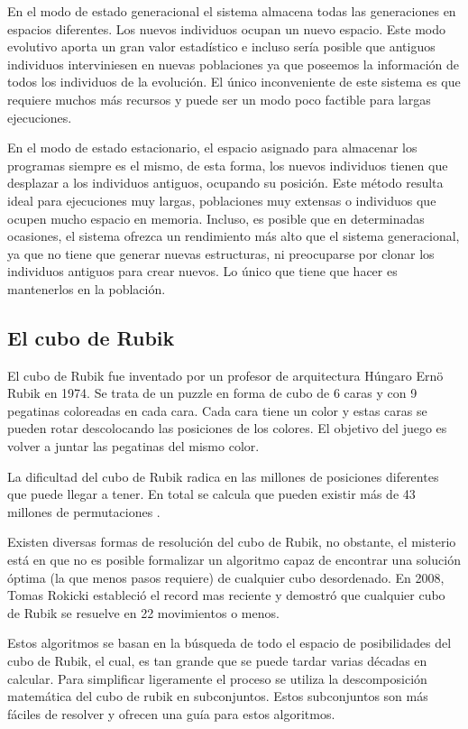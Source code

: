 En el modo de estado generacional el sistema almacena todas las generaciones en espacios diferentes. Los nuevos
individuos ocupan un nuevo espacio. Este modo evolutivo aporta un gran valor
estadístico e incluso sería posible que antiguos individuos interviniesen en
nuevas poblaciones ya que poseemos la información de todos los
individuos de la evolución. El único inconveniente de este sistema es que requiere muchos más recursos y puede
ser un modo poco factible para largas ejecuciones.

En el modo de estado estacionario, el espacio asignado para almacenar los
programas siempre es el mismo, de esta forma, los nuevos individuos tienen que
desplazar a los individuos antiguos, ocupando su posición. Este método resulta
ideal para ejecuciones muy largas, poblaciones muy extensas o individuos que
ocupen mucho espacio en memoria. Incluso, es posible que en determinadas
ocasiones, el sistema ofrezca un rendimiento más alto que el sistema
generacional, ya que no tiene que generar nuevas estructuras, ni preocuparse por
clonar los individuos antiguos para crear nuevos. Lo único que tiene que hacer es
mantenerlos en la población.

\subsection{El cubo de Rubik}

El cubo de Rubik fue inventado por un profesor de arquitectura Húngaro Ernö Rubik
en 1974. Se trata de un puzzle en forma de cubo de 6 caras y con 9 pegatinas
coloreadas en cada cara.  Cada cara tiene un color y estas caras se pueden rotar
descolocando las posiciones de los colores. El objetivo del juego es volver a
juntar las pegatinas del mismo color.

La dificultad del cubo de Rubik radica en las millones de posiciones diferentes
que puede llegar a tener. En total se calcula que pueden existir más de 43
millones de permutaciones \cite{wiki:Rubik}.

Existen diversas formas de resolución del cubo de Rubik, no obstante, el misterio está en que no es posible
formalizar un algoritmo capaz de encontrar una solución óptima (la que menos pasos requiere) de cualquier cubo
desordenado. En 2008, Tomas Rokicki  \cite{Rokicki:2008} estableció el record
mas reciente y demostró que cualquier cubo de Rubik se resuelve en 22 movimientos o menos.

Estos algoritmos se basan en la búsqueda de todo el espacio de posibilidades del cubo de Rubik, el cual, es tan
grande que se puede tardar varias décadas en calcular. Para simplificar ligeramente el proceso se utiliza la
descomposición matemática del cubo de rubik en subconjuntos. Estos subconjuntos son más fáciles de resolver y
ofrecen una guía para estos algoritmos.

